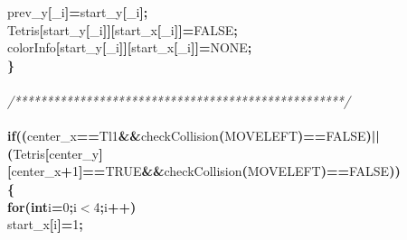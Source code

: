 \documentclass[a4paper, 10pt]{article}
\newcommand\SPC{\hspace*{0.6em}}
\newcommand\HYP{\mbox{\char 45}}
\newcommand{\CppAComment}[1]{\textit{\textcolor[rgb]{0.2,0.6,1}{#1}}}
\newcommand{\CppAIdentifier}[1]{#1}
\newcommand{\CppANumber}[1]{\textcolor[rgb]{0.5,0,0.5}{#1}}
\newcommand{\CppAReservedWord}[1]{\textbf{#1}}
\newcommand{\CppASpace}[1]{\colorbox[rgb]{1,1,1}{#1}}
\newcommand{\CppASymbol}[1]{\textbf{\textcolor[rgb]{1,0,0}{#1}}}
\begin{document}
\begin{ttfamily}
\CppASpace{\SPC \SPC \SPC \SPC \SPC }\CppAIdentifier{prev\_y}\CppASymbol{[}\CppAIdentifier{\_i}\CppASymbol{]}\CppASymbol{=}\CppAIdentifier{start\_y}\CppASymbol{[}\CppAIdentifier{\_i}\CppASymbol{]}\CppASymbol{;}\\
\CppASpace{\SPC \SPC \SPC \SPC \SPC }\CppAIdentifier{Tetris}\CppASymbol{[}\CppAIdentifier{start\_y}\CppASymbol{[}\CppAIdentifier{\_i}\CppASymbol{]}\CppASymbol{]}\CppASymbol{[}\CppAIdentifier{start\_x}\CppASymbol{[}\CppAIdentifier{\_i}\CppASymbol{]}\CppASymbol{]}\CppASymbol{=}\CppAIdentifier{FALSE}\CppASymbol{;}\\
\CppASpace{\SPC \SPC \SPC \SPC \SPC }\CppAIdentifier{colorInfo}\CppASymbol{[}\CppAIdentifier{start\_y}\CppASymbol{[}\CppAIdentifier{\_i}\CppASymbol{]}\CppASymbol{]}\CppASymbol{[}\CppAIdentifier{start\_x}\CppASymbol{[}\CppAIdentifier{\_i}\CppASymbol{]}\CppASymbol{]}\CppASymbol{=}\CppAIdentifier{NONE}\CppASymbol{;}\\
\CppASpace{\SPC \SPC \SPC \SPC }\CppASymbol{\}}\\
\\
\CppASpace{\SPC \SPC \SPC \SPC }\CppAComment{/***************************************************/}\\
\\
\CppASpace{\SPC \SPC \SPC \SPC }\CppAReservedWord{if}\CppASymbol{(}\CppASymbol{(}\CppAIdentifier{center\_x}\CppASymbol{==}\CppAIdentifier{Tl}\CppASymbol{\HYP }\CppANumber{1}\CppASpace{\SPC }\CppASymbol{\&\&}\CppASpace{\SPC }\CppAIdentifier{checkCollision}\CppASymbol{(}\CppAIdentifier{MOVELEFT}\CppASymbol{)}\CppASymbol{==}\CppAIdentifier{FALSE}\CppASymbol{)}\CppASpace{\SPC }\CppASymbol{||}\CppASpace{\SPC }\CppASymbol{(}\CppAIdentifier{Tetris}\CppASymbol{[}\CppAIdentifier{center\_y}\CppASymbol{]}\CppASymbol{[}\CppAIdentifier{center\_x}\CppASymbol{+}\CppANumber{1}\CppASymbol{]}\CppASymbol{==}\CppAIdentifier{TRUE}\CppASymbol{\&\&}\CppAIdentifier{checkCollision}\CppASymbol{(}\CppAIdentifier{MOVELEFT}\CppASymbol{)}\CppASymbol{==}\CppAIdentifier{FALSE}\CppASymbol{)}\CppASymbol{)}\\
\CppASpace{\SPC \SPC \SPC \SPC }\CppASymbol{\{}\\
\CppASpace{\SPC \SPC \SPC \SPC \SPC }\CppAReservedWord{for}\CppASymbol{(}\CppAReservedWord{int}\CppASpace{\SPC }\CppAIdentifier{i}\CppASymbol{=}\CppANumber{0}\CppASymbol{;}\CppAIdentifier{i}\CppASymbol{$<$}\CppANumber{4}\CppASymbol{;}\CppAIdentifier{i}\CppASymbol{++}\CppASymbol{)}\\
\CppASpace{\SPC \SPC \SPC \SPC \SPC \SPC }\CppAIdentifier{start\_x}\CppASymbol{[}\CppAIdentifier{i}\CppASymbol{]}\CppASymbol{\HYP =}\CppANumber{1}\CppASymbol{;}\\

\end{ttfamily}
\end{document}
